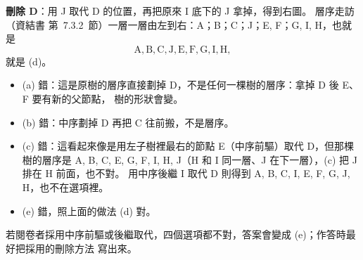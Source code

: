 \begin{pastsoln}
\textbf{刪除 D}：用 J 取代 D 的位置，再把原來 I 底下的 J 拿掉，得到右圖。 層序走訪（資結書
第~7.3.2~節）一層一層由左到右：A；B；C；J；E, F；G, I, H，也就是
\[
\mathrm{A, B, C, J, E, F, G, I, H},
\]
就是 (d)。

\begin{itemize}
\item (a) 錯：這是原樹的層序直接劃掉 D，不是任何一棵樹的層序：拿掉 D 後 E、F 要有新的父節點，
樹的形狀會變。
\item (b) 錯：中序劃掉 D 再把 C 往前搬，不是層序。
\item (c) 錯：這看起來像是用左子樹裡最右的節點 E（中序前驅）取代 D，但那棵樹的層序是
A, B, C, E, G, F, I, H, J（H 和 I 同一層、J 在下一層），(c) 把 J 排在 H 前面，也不對。 用中序後繼 I
取代 D 則得到 A, B, C, I, E, F, G, J, H，也不在選項裡。
\item (e) 錯，照上面的做法 (d) 對。
\end{itemize}
若閱卷者採用中序前驅或後繼取代，四個選項都不對，答案會變成 (e)；作答時最好把採用的刪除方法
寫出來。
\end{pastsoln}
